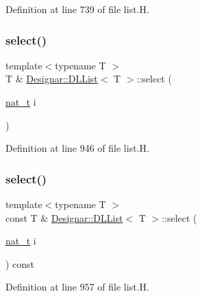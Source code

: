 Definition at line 739 of file list.\+H.

\mbox{\label{class_designar_1_1_d_l_list_abb57692be6aa79d00b65e40cd8402621}} 
\subsubsection{\texorpdfstring{select()}{select()}\hspace{0.1cm}{\footnotesize\ttfamily [1/2]}}
{\footnotesize\ttfamily template$<$typename T $>$ \\
T \& \hyperlink{class_designar_1_1_d_l_list}{Designar\+::\+D\+L\+List}$<$ T $>$\+::select (\begin{DoxyParamCaption}\item[{\hyperlink{namespace_designar_aa72662848b9f4815e7bf31a7cf3e33d1}{nat\+\_\+t}}]{i }\end{DoxyParamCaption})}



Definition at line 946 of file list.\+H.

\mbox{\label{class_designar_1_1_d_l_list_a7060ef1496f583a3d4ed64b8ffdb94c8}} 
\subsubsection{\texorpdfstring{select()}{select()}\hspace{0.1cm}{\footnotesize\ttfamily [2/2]}}
{\footnotesize\ttfamily template$<$typename T $>$ \\
const T \& \hyperlink{class_designar_1_1_d_l_list}{Designar\+::\+D\+L\+List}$<$ T $>$\+::select (\begin{DoxyParamCaption}\item[{\hyperlink{namespace_designar_aa72662848b9f4815e7bf31a7cf3e33d1}{nat\+\_\+t}}]{i }\end{DoxyParamCaption}) const}



Definition at line 957 of file list.\+H.

\mbox{\label{class_designar_1_1_d_l_list_a77234df6ebb6620ecf124e1810d9741c}} 
